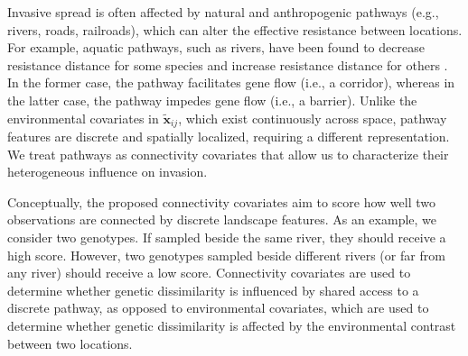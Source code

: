 \documentclass{article}
\begin{document}
Invasive spread is often affected by natural and anthropogenic pathways (e.g., rivers, roads, railroads), which can alter the effective resistance between locations. For example, aquatic pathways, such as rivers, have been found to decrease resistance distance for some species \citep{erHos2019landscape} and increase resistance distance for others \citep{bartakova2015terrestrial}. In the former case, the pathway facilitates gene flow (i.e., a corridor), whereas in the latter case, the pathway impedes gene flow (i.e., a barrier). 
Unlike the environmental covariates in $\widetilde{\mathbf{x}}_{ij}$, which exist continuously across space, pathway features are discrete and spatially localized, requiring a different representation. 
We treat pathways as connectivity covariates that allow us to characterize their heterogeneous influence on invasion.

Conceptually, the proposed connectivity covariates aim to score how well two observations are connected by discrete landscape features. As an example, we consider two genotypes. If sampled beside the same river, they should receive a high score. However, two genotypes sampled beside different rivers (or far from any river) should receive a low score.
Connectivity covariates are used to determine whether genetic dissimilarity is influenced by shared access to a discrete pathway, as opposed to environmental covariates, which are used to determine whether genetic dissimilarity is affected by the environmental contrast between two locations.
\end{document}
